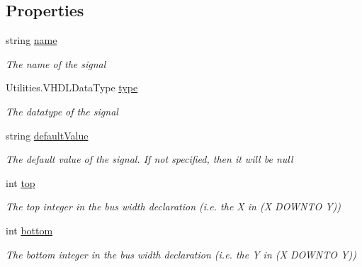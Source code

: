 \subsection*{Properties}
\begin{DoxyCompactItemize}
\item 
string \hyperlink{class_n_n_gen_1_1_signal_ae7a3bd5d6385e96cbd244dfdf674a6e6}{name}
\begin{DoxyCompactList}\small\item\em The name of the signal \end{DoxyCompactList}\item 
Utilities.\+V\+H\+D\+L\+Data\+Type \hyperlink{class_n_n_gen_1_1_signal_a587998f4c25cb8bdaf5358e9f240c122}{type}
\begin{DoxyCompactList}\small\item\em The datatype of the signal \end{DoxyCompactList}\item 
string \hyperlink{class_n_n_gen_1_1_signal_ac98333aa2ce1fdd3f3748ba8cfc4b932}{default\+Value}
\begin{DoxyCompactList}\small\item\em The default value of the signal. If not specified, then it will be null \end{DoxyCompactList}\item 
int \hyperlink{class_n_n_gen_1_1_signal_a0ba4a498e3bc647b39a2c100c7d8cd60}{top}
\begin{DoxyCompactList}\small\item\em The top integer in the bus width declaration (i.\+e. the \textquotesingle{}X\textquotesingle{} in (X D\+O\+W\+N\+T\+O Y)) \end{DoxyCompactList}\item 
int \hyperlink{class_n_n_gen_1_1_signal_a62c486db61e28bb2348c2534f25780cc}{bottom}
\begin{DoxyCompactList}\small\item\em The bottom integer in the bus width declaration (i.\+e. the \textquotesingle{}Y\textquotesingle{} in (X D\+O\+W\+N\+T\+O Y)) \end{DoxyCompactList}\end{DoxyCompactItemize}


